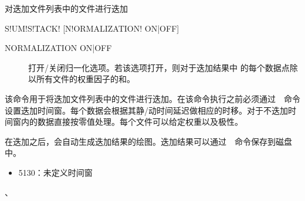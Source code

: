 \label{sss:sumstack}

对迭加文件列表中的文件进行迭加

\begin{SACSTX}
S!UM!S!TACK! [N!ORMALIZATION! ON|OFF]
\end{SACSTX}

\begin{description}
\item [NORMALIZATION ON|OFF] 打开/关闭归一化选项。若该选项打开，则对于迭加结果中
的每个数据点除以所有文件的权重因子的和。
\end{description}

该命令用于将迭加文件列表中的文件进行迭加。在该命令执行之前必须通过~~命令设置迭加时间窗。每个数据会根据其静/动时间延迟做相应的时移。对于不迭加时间窗内的数据直接按零值处理。每个文件可以给定权重以及极性。

在迭加之后，会自动生成迭加结果的绘图。迭加结果可以通过~~命令保存到磁盘中。

\begin{itemize}
\item 5130：未定义时间窗
\end{itemize}

、
